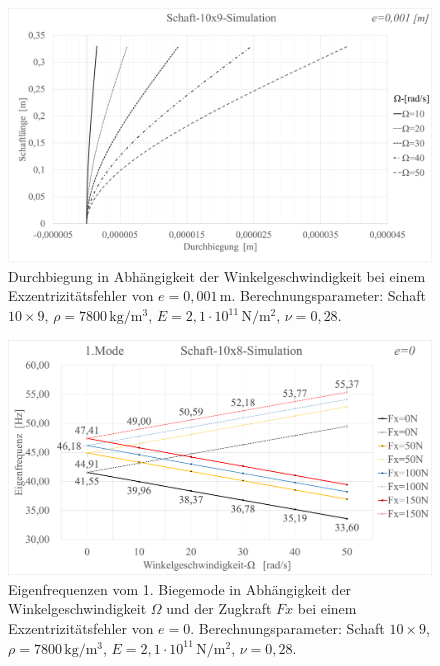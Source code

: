 	\begin{figure}[H]
		\centering
		\includegraphics[width=0.95\linewidth, height=0.40\textheight]{Ergebnisse/Schaft_10x9_Biegung_Simu} 
		\caption{Durchbiegung in Abhängigkeit der Winkelgeschwindigkeit bei einem Exzentrizitätsfehler von $ e=0,001\,\text{m}$. Berechnungsparameter: Schaft $ 10\times9 $, $\rho = 7800 \,\text{kg}/\text{m}^{3} $, $ E=2,1\cdot 10^{11} \,\text{N}/\text{m}^{2} $, $ \nu=0,28 $.}
		\label{fig:Result-Schaft-10x9-Simulation-Durchbiegung}
	\end{figure}
	
	
	\begin{figure}[H]
		\centering
		\includegraphics[width=0.95\linewidth, height=0.38\textheight]{Ergebnisse/Schaft_10x9_Zugkraft_Simu} 
		\caption{Eigenfrequenzen vom 1. Biegemode in Abhängigkeit der Winkelgeschwindigkeit $ \Omega $ und der Zugkraft $ Fx $ bei einem Exzentrizitätsfehler von $ e=0 $. Berechnungsparameter: Schaft $ 10\times9 $, $\rho = 7800 \,\text{kg}/\text{m}^{3} $, $ E=2,1\cdot 10^{11} \,\text{N}/\text{m}^{2} $, $ \nu=0,28 $.}
		\label{fig:Result-Schaft-10x9-Simulation-Zugkraft}
	\end{figure}


